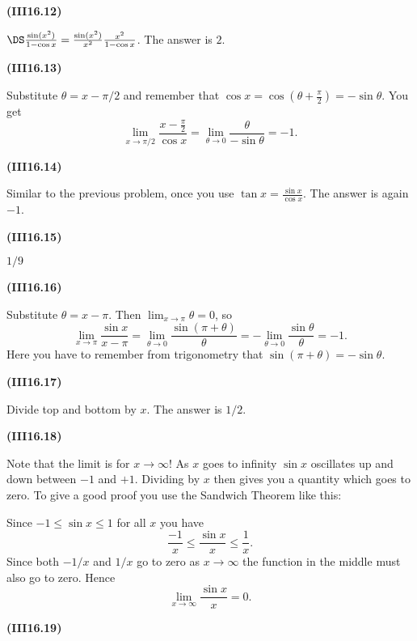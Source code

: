 \documentclass[openany,reqno]{amsbook}
\begin{document}
\begin{trivlist}
\item[{\bf(III16.12)}]

  $\DS  \frac{\sin(x^2)}{ 1-\cos x} = \frac{\sin (x^2)}{x^2} \frac{x^2}{1-\cos x}$.  The answer is $2$.
  \bigskip

\item[{\bf(III16.13)}]

  Substitute \(\theta = x-\pi/2\) and remember that \(\cos x = \cos(\theta+\frac\pi2) = -\sin\theta\).  You get
  \[
    \lim_{x\to\pi/2}\frac{x-\tfrac\pi2}{\cos x} =\lim_{\theta\to0}
    \frac{\theta}{-\sin\theta} = -1.
  \]
  \bigskip

\item[{\bf(III16.14)}]

  Similar to the previous problem, once you use \(\tan x = \frac{\sin
  x}{\cos x}\). The answer is again \(-1\).
  \bigskip

\item[{\bf(III16.15)}]

  $1/9$
  \bigskip

\item[{\bf(III16.16)}]

  Substitute \(\theta = x-\pi\).  Then \(\lim_{x\to\pi}\theta=0\), so
  \[
    \lim_{x\to \pi}\frac{\sin x}{x-\pi} = \lim_{\theta\to0}
    \frac{\sin(\pi+\theta)}{\theta} = -\lim_{\theta\to0}
    \frac{\sin\theta}{\theta} = -1.
  \]
  Here you have to remember from trigonometry that \(\sin(\pi+\theta)
  = -\sin\theta\).
  \bigskip

\item[{\bf(III16.17)}]

  Divide top and bottom by $x$.  The answer is $1/2$.
  \bigskip

\item[{\bf(III16.18)}]

  Note that the limit is for \(x\to\infty\)!  As \(x\) goes to
  infinity \(\sin x\) oscillates up and down between \(-1\) and
  \(+1\).  Dividing by \(x\) then gives you a quantity which goes to
  zero.  To give a good proof you use the Sandwich Theorem like this:
  \smallskip

  Since \(-1\le \sin x\le 1\) for all \(x\) you have
  \[
    \frac{-1}{x} \le \frac{\sin x}{x} \le \frac{1}{x}.
  \]
  Since both \(-1/x\) and \(1/x\) go to zero as \(x\to\infty\) the
  function in the middle must also go to zero.  Hence
  \[
    \lim_{x\to\infty} \frac{\sin x}{x} = 0.
  \]
  \bigskip

\item[{\bf(III16.19)}]


\end{trivlist}
\end{document}
